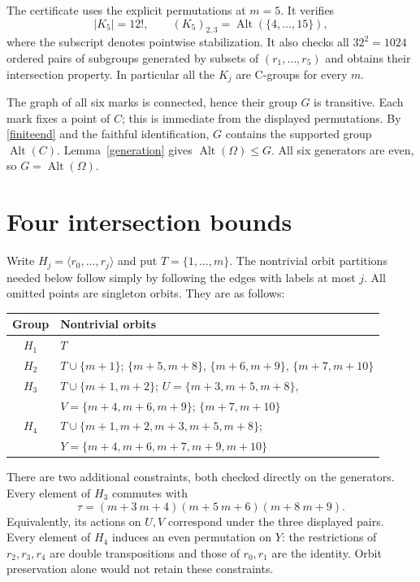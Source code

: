 \documentclass[11pt]{article}
\newcommand{\gen}[1]{\langle #1\rangle}
\newcommand{\Alt}{\operatorname{Alt}}
\begin{document}
The certificate uses the explicit permutations at $m=5$. It verifies
\begin{equation}\label{finiteend}
 |K_5|=12!,\qquad (K_5)_{2,3}=\Alt(\{4,\ldots,15\}),
\end{equation}
where the subscript denotes pointwise stabilization. It also checks
all $32^2=1024$ ordered pairs of subgroups generated by subsets of
$(r_1,\ldots,r_5)$ and obtains their intersection property. In particular
all the $K_j$ are C-groups for every $m$.

The graph of all six marks is connected, hence their group $G$ is
transitive. Each mark fixes a point of $C$; this is immediate from the
displayed permutations. By \eqref{finiteend} and the faithful
identification, $G$ contains the supported group $\Alt(C)$.
Lemma~\ref{generation} gives $\Alt(\Omega)\leq G$. All six generators
are even, so $G=\Alt(\Omega)$.

\section{Four intersection bounds}
Write $H_j=\gen{r_0,\ldots,r_j}$ and put $T=\{1,\ldots,m\}$.
The nontrivial orbit partitions needed below follow simply by following
the edges with labels at most $j$. All omitted points are singleton
orbits. They are as follows:
\begin{center}\small
\begin{tabular}{cl}
\toprule
Group & Nontrivial orbits\\\midrule
$H_1$ & $T$\\
$H_2$ & $T\cup\{m+1\}$;
 $\{m+5,m+8\}$, $\{m+6,m+9\}$, $\{m+7,m+10\}$\\
$H_3$ & $T\cup\{m+1,m+2\}$;
 $U=\{m+3,m+5,m+8\}$,\\
 & $V=\{m+4,m+6,m+9\}$; $\{m+7,m+10\}$\\
$H_4$ & $T\cup\{m+1,m+2,m+3,m+5,m+8\}$;\\
 & $Y=\{m+4,m+6,m+7,m+9,m+10\}$\\\bottomrule
\end{tabular}
\end{center}
There are two additional constraints, both checked directly on the
generators. Every element of $H_3$ commutes with
\[
 \tau=(m+3\ m+4)(m+5\ m+6)(m+8\ m+9).
\]
Equivalently, its actions on $U,V$ correspond under the three displayed
pairs. Every element of $H_4$ induces an even permutation on $Y$:
the restrictions of $r_2,r_3,r_4$ are double transpositions and those
of $r_0,r_1$ are the identity. Orbit preservation alone would not retain
these constraints.
\end{document}

